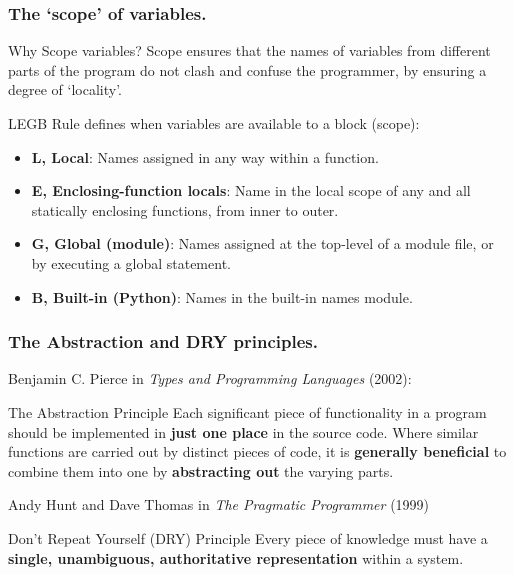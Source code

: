 \documentclass{beamer} %
\newcommand\emc[1]{\textcolor{midred}{\textbf{#1}}}
\begin{document}
\begin{frame}
\frametitle{The `scope' of variables.}

\begin{block}{Why Scope variables?}
Scope ensures that the names of variables from different parts of the program do not clash and 
confuse the programmer, by ensuring a degree of `locality'. 
\end{block}

LEGB Rule defines when variables are available to a block (scope):
\begin{itemize}
\item \emc{L, Local}: Names assigned in any way within a function.
\item \emc{E, Enclosing-function locals}: Name in the local scope of any and all statically enclosing functions, from inner to outer.
\item \emc{G, Global (module)}: Names assigned at the top-level of a module file, or by executing a global statement.
\item \emc{B, Built-in (Python)}: Names in the built-in names module.
\end{itemize}
\end{frame}

\begin{frame}
\frametitle{The Abstraction and DRY principles.}

Benjamin C. Pierce in \emph{Types and Programming Languages} (2002):
\begin{block}{The Abstraction Principle}
Each significant piece of functionality in a program should be implemented in \emc{just one place} in the source code. Where similar functions are carried out by distinct pieces of code, it is \emc{generally beneficial} to combine them into one by \emc{abstracting out} the varying parts.
\end{block}

 Andy Hunt and Dave Thomas in \emph{The Pragmatic Programmer} (1999)
\begin{block}{Don't Repeat Yourself (DRY) Principle}
Every piece of knowledge must have a \emc{single, unambiguous, authoritative representation} within a system.
\end{block}

\end{frame}

\end{document}
